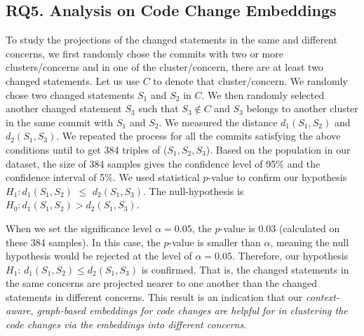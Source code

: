 \subsection{RQ5. Analysis on Code Change Embeddings}

To study the projections of the changed statements in the same and
different concerns, we first randomly chose the commits with two or
more clusters/concerns and in one of the cluster/concern, there are at
least two changed statements. Let us use $C$ to denote that
cluster/concern. We randomly chose two changed statements $S_1$ and
$S_2$ in $C$. We then randomly selected another changed statement
$S_3$ such that $S_3 \notin C$ and $S_3$ belongs to another cluster in
the same commit with $S_1$ and $S_2$. We measured the distance
$d_1(S_1,S_2)$ and $d_2(S_1,S_3)$. We repeated the process for all the
commits satisfying the above conditions until to get 384 triples of
($S_1, S_2, S_3$). Based on the population in our dataset, the size of
384 samples gives the confidence level of 95\% and the confidence
interval of 5\%.
%
We used statistical $p$-value to confirm our hypothesis
$H_1: d_1(S_1,S_2)$ $\leq$ $d_2(S_1,S_3)$. The null-hypothesis is
\textit{\textbf{$H_0: d_1(S_1,S_2) > d_2(S_1,S_3)$}}.

When we set the significance level $\alpha = 0.05$, the $p$-value is
$0.03$ (calculated on these 384 samples). In this case, the $p$-value
is smaller than $\alpha$, meaning the null hypothesis would be
rejected at the level of $\alpha = 0.05$. Therefore, our hypothesis
$H_1$: $d_1(S_1,S_2)$$ \leq$$ d_2(S_1,S_3)$ is confirmed.  That is,
the changed statements in the same concerns are projected nearer to
one another than the changed statements in different concerns. This
result is an indication that our {\em context-aware, graph-based
  embeddings for code changes are helpful for {\tool} in clustering the code
  changes via the embeddings into different concerns}.






